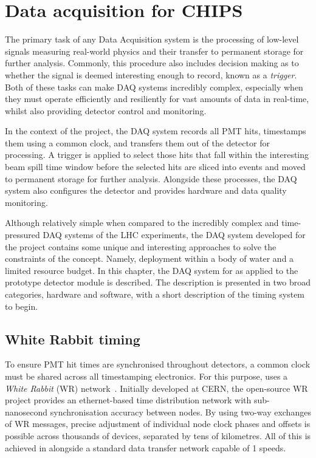 \chapter{Data acquisition for CHIPS} %
\label{chap:daq} %

The primary task of any Data Acquisition system is the processing of low-level signals measuring
real-world physics and their transfer to permanent storage for further analysis. Commonly, this
procedure also includes decision making as to whether the signal is deemed interesting enough to
record, known as a \emph{trigger}. Both of these tasks can make DAQ systems incredibly complex,
especially when they must operate efficiently and resiliently for vast amounts of data in
real-time, whilst also providing detector control and monitoring.

In the context of the \chips project, the DAQ system records all PMT hits, timestamps them using a
common clock, and transfers them out of the detector for processing. A trigger is applied to
select those hits that fall within the interesting \numi beam spill time window before the
selected hits are sliced into events and moved to permanent storage for further analysis.
Alongside these processes, the DAQ system also configures the detector and provides hardware and
data quality monitoring.

Although relatively simple when compared to the incredibly complex and time-pressured DAQ systems
of the LHC experiments, the DAQ system developed for the \chips project contains some unique and
interesting approaches to solve the constraints of the \chips concept. Namely, deployment within a
body of water and a limited resource budget. In this chapter, the DAQ system for \chips as applied
to the \chipsfive prototype detector module is described. The description is presented in two
broad categories, hardware and software, with a short description of the timing system to begin.

\section{White Rabbit timing} %
\label{sec:daq_timing} %

To ensure PMT hit times are synchronised throughout \chips detectors, a common clock must be
shared across all timestamping electronics. For this purpose, \chips uses a \emph{White Rabbit}
(WR) network~\cite{lipinski2011}. Initially developed at CERN, the open-source WR project provides
an ethernet-based time distribution network with sub-nanosecond synchronisation accuracy between
nodes. By using two-way exchanges of WR messages, precise adjustment of individual node clock
phases and offsets is possible across thousands of devices, separated by tens of kilometres. All
of this is achieved in alongside a standard data transfer network capable of \unit{1}{}
speeds.

